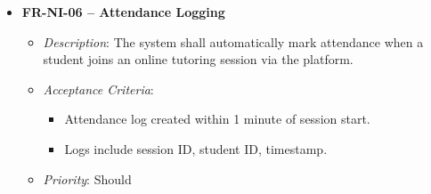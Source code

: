 \begin{itemize}
    \item \textbf{FR-NI-06 – Attendance Logging}
        \begin{itemize}
            \item \textit{Description}: The system shall automatically mark attendance when a student joins an online tutoring session via the platform.
            \item \textit{Acceptance Criteria}: 
                \begin{itemize}
                    \item Attendance log created within 1 minute of session start.
                    \item Logs include session ID, student ID, timestamp.
                \end{itemize}
            \item \textit{Priority}: Should
        \end{itemize}
\end{itemize}
\textbf{}